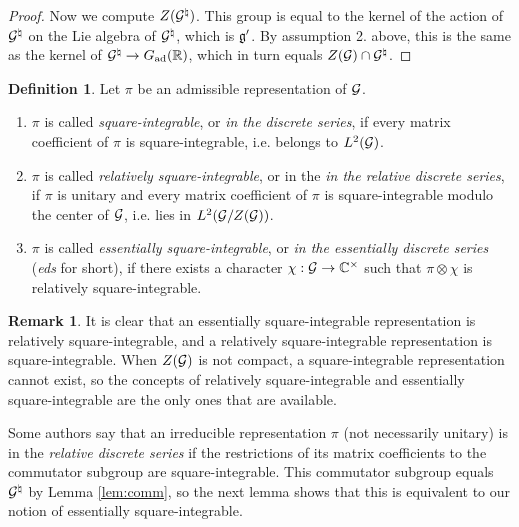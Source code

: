 \documentclass{article}
\theoremstyle{definition}
\newtheorem{dfn}[thm]{Definition}
\newtheorem{rem}[thm]{Remark}
\numberwithin{equation}{section}
\renewcommand{\-}{\hyp{}}
\begin{document}
\begin{proof}
	Now we compute $Z(\mathcal{G}^\natural)$. This group is equal to the kernel of the action of $\mathcal{G}^\natural$ on the Lie algebra of $\mathcal{G}^\natural$, which is $\mathfrak{g}'$. By assumption 2. above, this is the same as the kernel of $\mathcal{G}^\natural \to G_{\textrm{ad}}(\mathbb{R})$, which in turn equals $Z(\mathcal{G}) \cap \mathcal{G}^\natural$.
\end{proof}

\begin{dfn} \label{dfn:eds}
	Let $\pi$ be an admissible representation of $\mathcal{G}$.
	\begin{enumerate}
		\item $\pi$ is called \emph{square-integrable}, or \emph{in the discrete series}, if every matrix coefficient of $\pi$ is square-integrable, i.e. belongs to $L^2(\mathcal{G})$.
  		\item $\pi$ is called \emph{relatively square-integrable}, or in the \emph{in the relative discrete series}, if $\pi$ is unitary and 
                  every matrix coefficient of $\pi$ is square-integrable modulo the center of $\mathcal{G}$, i.e. lies in $L^2(\mathcal{G}/Z(\mathcal{G}))$.

  		\item $\pi$ is called  \emph{essentially square-integrable}, or  \emph{in the essentially discrete series} (\emph{eds} for short), if there exists a character $\chi : \mathcal{G} \to \mathbb{C}^\times$ such that $\pi \otimes \chi$ is relatively square-integrable.
	\end{enumerate}
\end{dfn}

\begin{rem}
It is clear that an essentially square-integrable representation is relatively square-integrable, and a relatively square-integrable representation is square-integrable. When $Z(\mathcal{G})$ is not compact, a square-integrable representation cannot exist, so the concepts of relatively square-integrable and essentially square-integrable are the only ones that are available.

Some authors say that an irreducible representation $\pi$ (not necessarily unitary) is in the \emph{relative discrete series} if the restrictions of its matrix coefficients to the commutator subgroup are square-integrable. This commutator subgroup equals $\mathcal{G}^\natural$ by Lemma \ref{lem:comm}, so the next lemma shows that this is equivalent to our notion of essentially square-integrable.
\end{rem}
\end{document}
